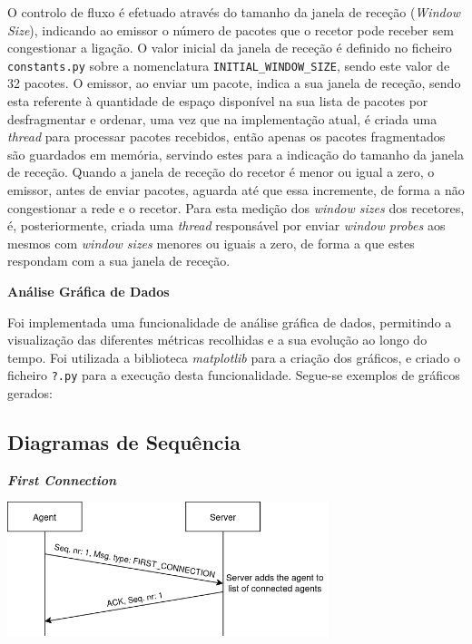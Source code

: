 \documentclass[a4paper,12pt]{scrreprt}
\begin{document}
O controlo de fluxo é efetuado através do tamanho da janela de receção (\textit{Window Size}),
indicando ao emissor o número de pacotes que o recetor pode receber sem congestionar a ligação.
O valor inicial da janela de receção é definido no ficheiro \texttt{constants.py} sobre a nomenclatura
\texttt{INITIAL\_WINDOW\_SIZE}, sendo este valor de 32 pacotes. O emissor, ao enviar um pacote, indica
a sua janela de receção, sendo esta referente à quantidade de espaço disponível na sua lista de pacotes
por desfragmentar e ordenar, uma vez que na implementação atual, é criada uma \textit{thread} para processar
pacotes recebidos, então apenas os pacotes fragmentados são guardados em memória, servindo estes para a indicação
do tamanho da janela de receção.
Quando a janela de receção do recetor é menor ou igual a zero, o emissor, antes de enviar pacotes, aguarda até que essa incremente,
de forma a não congestionar a rede e o recetor. Para esta medição dos \textit{window sizes}
dos recetores, é, posteriormente, criada uma \textit{thread} responsável por enviar \textit{window probes} aos mesmos
com \textit{window sizes} menores ou iguais a zero, de forma a que estes respondam com a sua janela de receção.

\textbf{Análise Gráfica de Dados}

Foi implementada uma funcionalidade de análise gráfica de dados, permitindo a visualização
das diferentes métricas recolhidas e a sua evolução ao longo do tempo. Foi utilizada a biblioteca
\textit{matplotlib} para a criação dos gráficos, e criado o ficheiro \texttt{?.py} para a execução
desta funcionalidade. Segue-se exemplos de gráficos gerados:


\clearpage
{}
\subsection{Diagramas de Sequência}

\textbf{\textit{First Connection}}

\begin{minipage}{\textwidth}
    \centering
    \includegraphics[width=0.7\textwidth]{img/sequence_diagrams/first_connection.png}
    \label{fig:nt_first_connection}
\end{minipage}
\end{document}
